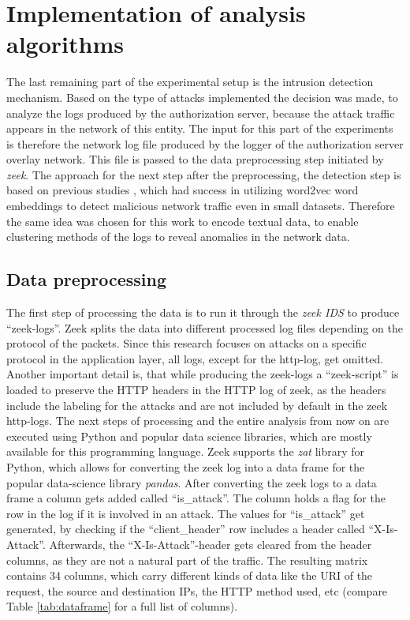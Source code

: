 \documentclass[
    fontsize=12pt,
    headings=small,
    parskip=half,           %
    bibliography=totoc,
    numbers=noenddot,       %
    open=any,               %
    ]{scrreprt}
\begin{document}
\section{Implementation of analysis algorithms}
The last remaining part of the experimental setup is the intrusion detection mechanism. Based on the type of attacks implemented the decision was made, to analyze the logs produced by the authorization server, because the attack traffic appears in the network of this entity. The input for this part of the experiments is therefore the network log file produced by the logger of the authorization server overlay network. This file is passed to the data preprocessing step initiated by \emph{zeek}. The approach for the next step after the preprocessing, the detection step is based on previous studies \cite{carrasco2018unsupervised} \cite{zhuo2017network}, which had success in utilizing word2vec word embeddings to detect malicious network traffic even in small datasets. Therefore the same idea was chosen for this work to encode textual data, to enable clustering methods of the logs to reveal anomalies in the network data.

\subsection{Data preprocessing}
\label{subsec:dataset}
The first step of processing the data is to run it through the \emph{zeek IDS} to produce ``zeek-logs''. Zeek splits the data into different processed log files depending on the protocol of the packets. Since this research focuses on attacks on a specific protocol in the application layer, all logs, except for the http-log, get omitted. Another important detail is, that while producing the zeek-logs a ``zeek-script'' is loaded to preserve the HTTP headers in the HTTP log of zeek, as the headers include the labeling for the attacks and are not included by default in the zeek http-logs. The next steps of processing and the entire analysis from now on are executed using Python and popular data science libraries, which are mostly available for this programming language. Zeek supports the \emph{zat} library for Python, which allows for converting the zeek log into a data frame for the popular data-science library \emph{pandas}. After converting the zeek logs to a data frame a column gets added called ``is\_attack''. The column holds a flag for the row in the log if it is involved in an attack. The values for ``is\_attack'' get generated, by checking if the ``client\_header'' row includes a header called ``X-Is-Attack''. Afterwards, the ``X-Is-Attack''-header gets cleared from the header columns, as they are not a natural part of the traffic. The resulting matrix contains 34 columns, which carry different kinds of data like the URI of the request, the source and destination IPs, the HTTP method used, etc (compare Table \ref{tab:dataframe} for a full list of columns).
\end{document}
